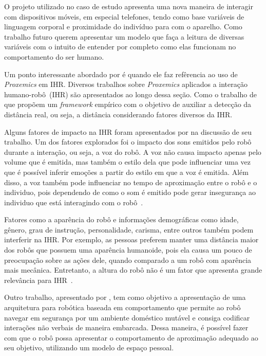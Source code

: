 O projeto utilizado no caso de estudo apresenta uma nova maneira de interagir com dispositivos móveis, em especial telefones, tendo como base variáveis de linguagem corporal e proximidade do indivíduo para com o aparelho. Como trabalho futuro \textcite{hemmert:2013} querem apresentar um modelo que faça a leitura de diversas variáveis com o intuito de entender por completo como elas funcionam no comportamento do ser humano.

Um ponto interessante abordado por \textcite{hemmert:2013} é quando ele faz refêrencia ao uso de \emph{Proxemics} em IHR. Diversos trabalhos sobre \emph{Proxemics} aplicados a interação humano-robô~(IHR) são apresentados ao longo dessa seção. Como o trabalho de \textcite{walters:2009} que propõem um \emph{framework} empírico com o objetivo de auxiliar a detecção da distância real, ou seja, a distância considerando fatores diversos da IHR.

Alguns fatores de impacto na IHR foram apresentados por \textcite{walters:2009} na discussão de seu trabalho. Um dos fatores explorados foi o impacto dos sons emitidos pelo robô durante a interação, ou seja, a voz do robô. A voz não causa impacto apenas pelo volume que é emitida, mas também o estilo dela que pode influenciar uma vez que é possível inferir emoções a partir do estilo em que a voz é emitida. Além disso, a voz também pode influenciar no tempo de aproximação entre o robô e o individuo, pois dependendo de como o som é emitido pode gerar insegurança ao individuo que está interagindo com o robô~\cite{walters:2009}.

Fatores como a aparência do robô e informações demográficas como idade, gênero, grau de instrução, personalidade, carisma, entre outros também podem interferir na IHR. Por exemplo, as pessoas preferem manter uma distância maior dos robôs que possuem uma aparência humanoide, pois ela causa um pouco de preocupação sobre as ações dele, quando comparado a um robô com aparência mais mecânica. Entretanto, a altura do robô não é um fator que apresenta grande relevância para IHR~\cite{walters:2009}.

Outro trabalho, apresentado por \textcite{torta:2011}, tem como objetivo a apresentação de uma arquitetura para robótica baseada em comportamento que permite ao robô navegar em segurança por um ambiente doméstico mutável e consiga codificar interações não verbais de maneira embarcada. Dessa maneira, é possível fazer com que o robô possa apresentar o comportamento de aproximação adequado ao seu objetivo, utilizando um modelo de espaço pessoal.

